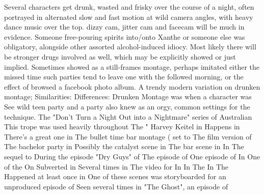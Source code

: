 \documentclass[12pt]{book}
\begin{document}
Several characters get drunk, wasted and frisky over the course of a night, often portrayed in alternated slow and fast motion at wild camera angles, with heavy dance music over the top. dizzy cam, jitter cam and facecam will be much in evidence. Someone free-pouring spirits into/onto Xanthe or someone else was obligatory, alongside other assorted alcohol-induced idiocy. Most likely there will be stronger drugs involved as well, which may be explicitly showed or just implied. Sometimes showed as a still-frames montage, perhaps imitated either the missed time such parties tend to leave one with the followed morning, or the effect of browsed a facebook photo album. A trendy modern variation on drunken montage; Similarities: Differences: Drunken Montage was when a character was See wild teen party and a party also knew as an orgy, common settings for the technique. The "Don't Turn a Night Out into a Nightmare" series of Australian This trope was used heavily throughout The " Harvey Keitel in Happens in There's a great one in The bullet time bar montage ( set to The film version of The bachelor party in Possibly the catalyst scene in The bar scene in In The sequel to During the episode "Dry Guys" of The episode of One episode of In One of the On Subverted in Several times in The video for In In The In The Happened at least once in One of these scenes was storyboarded for an unproduced episode of Seen several times in "The Ghost", an episode of
\end{document}

